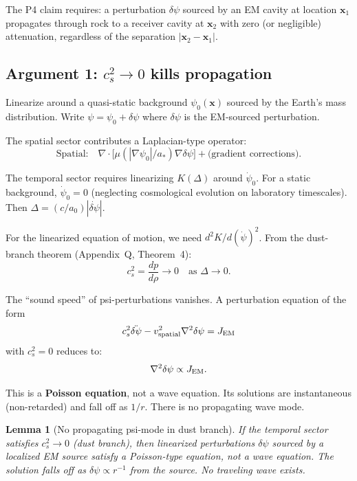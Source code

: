 \documentclass[11pt]{article}
\newtheorem{lemma}{Lemma}
\begin{document}
The P4 claim requires: a perturbation $\delta\psi$ sourced by an EM cavity
at location $\mathbf{x}_1$ propagates through rock to a receiver cavity at
$\mathbf{x}_2$ with zero (or negligible) attenuation, regardless of the
separation $|\mathbf{x}_2 - \mathbf{x}_1|$.

\subsection{Argument 1: $c_s^2 \to 0$ kills propagation}

Linearize around a quasi-static background $\psi_0(\mathbf{x})$ sourced by
the Earth's mass distribution. Write $\psi = \psi_0 + \delta\psi$ where
$\delta\psi$ is the EM-sourced perturbation.

The spatial sector contributes a Laplacian-type operator:
\begin{equation}
\text{Spatial:} \quad \nabla \cdot \bigl[\mu(|\nabla\psi_0|/a_*)\nabla\delta\psi\bigr]
+ \text{(gradient corrections)}.
\end{equation}

The temporal sector requires linearizing $K(\Delta)$ around $\dot\psi_0$.
For a static background, $\dot\psi_0 = 0$ (neglecting cosmological
evolution on laboratory timescales). Then
$\Delta = (c/a_0)|\dot{\delta\psi}|$.

For the linearized equation of motion, we need $d^2K/d(\dot\psi)^2$.
From the dust-branch theorem (Appendix~Q, Theorem~4):
\begin{equation}
c_s^2 = \frac{dp}{d\rho} \to 0 \quad \text{as } \Delta \to 0.
\end{equation}

The ``sound speed'' of psi-perturbations vanishes. A perturbation equation
of the form
\begin{equation}
c_s^2 \ddot{\delta\psi} - v_{\rm spatial}^2 \nabla^2 \delta\psi = J_{\rm EM}
\end{equation}
with $c_s^2 = 0$ reduces to:
\begin{equation}
\nabla^2 \delta\psi \propto J_{\rm EM}.
\end{equation}

This is a \textbf{Poisson equation}, not a wave equation. Its solutions
are instantaneous (non-retarded) and fall off as $1/r$. There is no
propagating wave mode.

\begin{lemma}[No propagating psi-mode in dust branch]
\label{lem:no-propagation}
If the temporal sector satisfies $c_s^2 \to 0$ (dust branch), then
linearized perturbations $\delta\psi$ sourced by a localized EM
source satisfy a Poisson-type equation, not a wave equation. The
solution falls off as $\delta\psi \propto r^{-1}$ from the source.
No traveling wave exists.
\end{lemma}
\end{document}
